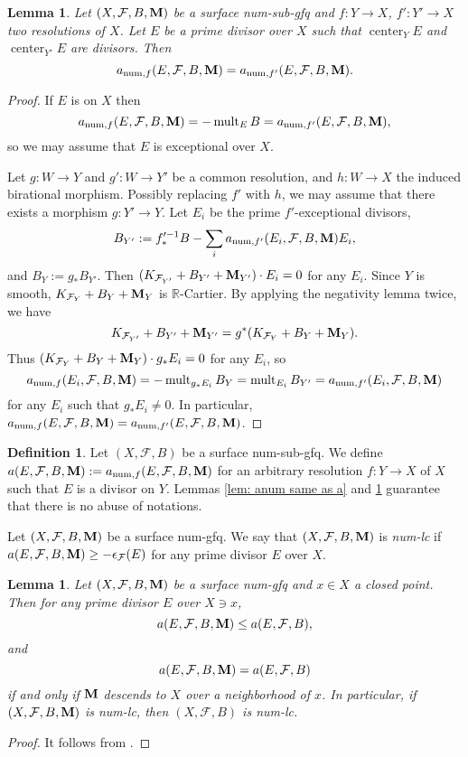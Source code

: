 \documentclass[11pt]{amsart}
\numberwithin{equation}{section}
\newcommand{\Mm}{{\bf{M}}}
\newcommand{\Rr}{\mathbb{R}}
\newcommand{\Center}{\operatorname{center}}
\newcommand{\num}{{\operatorname{num}}}
\newcommand{\mult}{\operatorname{mult}}
\newcommand{\Ff}{\mathcal{F}}
\newtheorem{lem}[thm]{Lemma}
\theoremstyle{definition}
\newtheorem{defn}[thm]{Definition}
\theoremstyle{definition}
\theoremstyle{definition}
\begin{document}
\begin{lem}\label{lem: anum not depend on resolution}
Let $(X,\Ff,B,\Mm)$ be a surface num-sub-gfq and $f: Y\rightarrow X$, $f': Y'\rightarrow X$ two resolutions of $X$. Let $E$ be a prime divisor over $X$ such that $\Center_YE$ and $\Center_{Y'}E$ are divisors. Then
$$a_{\num,f}(E,\Ff,B,\Mm)=a_{\num,f'}(E,\Ff,B,\Mm).$$
\end{lem}
\begin{proof}
If $E$ is on $X$ then $$a_{\num,f}(E,\Ff,B,\Mm)=-\mult_EB=a_{\num,f'}(E,\Ff,B,\Mm),$$ so we may assume that $E$ is exceptional over $X$.

Let $g: W\rightarrow Y$ and $g': W\rightarrow Y'$ be a common resolution, and $h: W\rightarrow X$ the induced birational morphism. Possibly replacing $f'$ with $h$, we may assume that there exists a morphism $g: Y'\rightarrow Y$. Let $E_i$ be the prime $f'$-exceptional divisors,
$$B_{Y'}:=f'^{-1}_*B-\sum_ia_{\num,f'}(E_i,\Ff,B,\Mm)E_i,$$
and $B_Y:=g_*B_{Y'}$.
Then $(K_{\Ff_{Y'}}+B_{Y'}+\Mm_{Y'})\cdot E_i=0$ for any $E_i$. Since $Y$ is smooth, $K_{\Ff_Y}+B_Y+\Mm_Y$ is $\Rr$-Cartier. By applying the negativity lemma twice, we have 
$$K_{\Ff_{Y'}}+B_{Y'}+\Mm_{Y'}=g^*(K_{\Ff_Y}+B_Y+\Mm_Y).$$ 
Thus $(K_{\Ff_Y}+B_Y+\Mm_Y)\cdot g_*E_i=0$ for any $E_i$, so 
$$a_{\num,f}(E_i,\Ff,B,\Mm)=-\mult_{g_*E_i}B_Y=\mult_{E_i}B_{Y'}=a_{\num,f'}(E_i,\Ff,B,\Mm)$$
for any $E_i$ such that $g_*E_i\not=0$. In particular, $a_{\num,f}(E,\Ff,B,\Mm)=a_{\num,f'}(E,\Ff,B,\Mm)$.
\end{proof}

\begin{defn}
Let $(X,\Ff,B)$ be a surface num-sub-gfq. We define $a(E,\Ff,B,\Mm):=a_{\num,f}(E,\Ff,B,\Mm)$ for an arbitrary resolution $f: Y\rightarrow X$ of $X$ such that $E$ is a divisor on $Y$. Lemmas \ref{lem: anum same as a} and \ref{lem: anum not depend on resolution} guarantee that there is no abuse of notations.

Let $(X,\Ff,B,\Mm)$ be a surface num-gfq. We say that $(X,\Ff,B,\Mm)$ is \emph{num-lc} if $a(E,\Ff,B,\Mm)\geq-\epsilon_{\Ff}(E)$ for any prime divisor $E$ over $X$.
\end{defn}

\begin{lem}\label{lem: add component worse sing}
Let $(X,\Ff,B,\Mm)$ be a surface num-gfq and $x\in X$ a closed point. Then for any prime divisor $E$ over $X\ni x$, 
$$a(E,\Ff,B,\Mm)\leq a(E,\Ff,B),$$ 
and 
$$a(E,\Ff,B,\Mm)=a(E,\Ff,B)$$
if and only if $\Mm$ descends to $X$ over a neighborhood of $x$. In particular, if $(X,\Ff,B,\Mm)$ is num-lc, then $(X,\Ff,B)$ is num-lc.
\end{lem}
\begin{proof} 
It follows from \cite[Lemma 3.41]{KM98}.
\end{proof}
\end{document}
